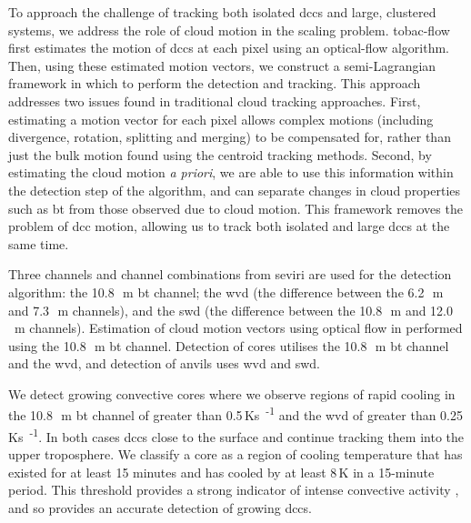 To approach the challenge of tracking both isolated \acrshort{dcc}s and large, clustered systems, we address the role of cloud motion in the scaling problem. 
tobac-flow first estimates the motion of \acrshort{dcc}s at each pixel using an optical-flow algorithm. 
Then, using these estimated motion vectors, we construct a semi-Lagrangian framework in which to perform the detection and tracking. 
This approach addresses two issues found in traditional cloud tracking approaches.
First, estimating a motion vector for each pixel allows complex motions (including divergence, rotation, splitting and merging) to be compensated for, rather than just the bulk motion found using the centroid tracking methods.
Second, by estimating the cloud motion \textit{a priori}, we are able to use this information within the detection step of the algorithm, and can separate changes in cloud properties such as \acrshort{bt} from those observed due to cloud motion.
This framework removes the problem of \acrshort{dcc} motion, allowing us to track both isolated and large \acrshort{dcc}s at the same time.

Three channels and channel combinations from \acrshort{seviri} are used for the detection algorithm: the 10.8\,\unit{\mu m} \acrshort{bt} channel; the \acrshort{wvd} (the difference between the 6.2\,\unit{\mu m} and 7.3\,\unit{\mu m} channels), and the \acrshort{swd} (the difference between the 10.8\,\unit{\mu m} and 12.0\,\unit{\mu m} channels).
Estimation of cloud motion vectors using optical flow in performed using the 10.8\,\unit{\mu m} \acrshort{bt} channel.
Detection of cores utilises the 10.8\,\unit{\mu m} \acrshort{bt} channel and the \acrshort{wvd}, and detection of anvils uses \acrshort{wvd} and \acrshort{swd}.

We detect growing convective cores where we observe regions of rapid cooling in the 10.8\,\unit{\mu m} \acrshort{bt} channel of greater than 0.5\,\unit{Ks\textsuperscript{-1}} and the \acrshort{wvd} of greater than 0.25\,\unit{Ks\textsuperscript{-1}}.
In both cases
\acrshort{dcc}s close to the surface and continue tracking them into the upper troposphere. 
We classify a core as a region of cooling temperature that has existed for at least 15 minutes and has cooled by at least 8\,\unit{K} in a 15-minute period. 
This threshold provides a strong indicator of intense convective activity \citep{roberts_nowcasting_2003}, and so provides an accurate detection of growing \acrshort{dcc}s.


